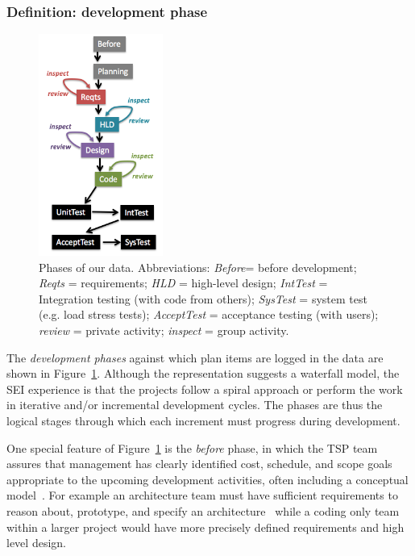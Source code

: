 \documentclass[smallcondensed]{svjour3}
\newcommand{\fig}[1]{Figure~\ref{fig:#1}}
\begin{document}
\subsubsection{Definition: development phase} \label{development_phase}
\begin{figure}[!b]  
\begin{center}
\includegraphics[width=1.6in]{img/wfall.png}  
\end{center}
\caption{Phases of our data.
Abbreviations: 
{\em Before}= before development; 
{\em Reqts}	  = requirements; 
{\em HLD}	  = high-level design; 
{\em IntTest} = Integration testing (with code from others); 
{\em SysTest} = system test (e.g. load stress tests); 
{\em AcceptTest}  = acceptance testing (with users); 
{\em review}        = private activity; 
{\em inspect}        = group activity.}
\label{fig:waterfall}
\end{figure}

The \textit{development phases} against which plan items are logged in the data are shown in \fig{waterfall}.
Although the representation suggests a waterfall model, the SEI experience is that the projects follow a spiral approach or perform the work in iterative and/or incremental development cycles. The phases are thus the logical stages through which each increment must progress during development.

One special feature of  \fig{waterfall} is the {\em before} phase, in which the TSP team assures that management has clearly identified cost, schedule, and scope goals appropriate to the upcoming development activities, often including a conceptual model~\cite{Humphrey:2005}. For example an architecture team must have sufficient requirements to reason about, prototype, and specify an architecture~\cite{Bachmann13} while a coding only team within a larger project would have more precisely defined requirements and high level design.
 
\end{document}
